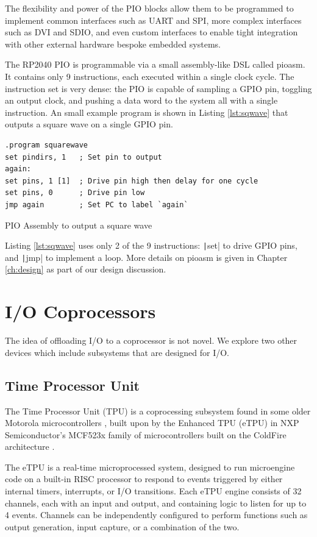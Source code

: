 The flexibility and power of the PIO blocks allow them to be programmed to implement common interfaces such as UART and SPI, more complex interfaces such as DVI and SDIO, and even custom interfaces to enable tight integration with other external hardware bespoke embedded systems.

The RP2040 PIO is programmable via a small assembly-like DSL called pioasm. It contains only 9 instructions, each executed within a single clock cycle. The instruction set is very dense: the PIO is capable of sampling a GPIO pin, toggling an output clock, and pushing a data word to the system all with a single instruction. An small example program is shown in Listing \ref{lst:sqwave} that outputs a square wave on a single GPIO pin.

\begin{listing}[b]
    \vspace{0.5cm}
    \begin{verbatim}
.program squarewave
set pindirs, 1   ; Set pin to output
again:
set pins, 1 [1]  ; Drive pin high then delay for one cycle
set pins, 0      ; Drive pin low
jmp again        ; Set PC to label `again`
    \end{verbatim}
    \caption{PIO Assembly to output a square wave \citep{rp2040}}
    \label{lst:sqwave}
\end{listing}

Listing \ref{lst:sqwave} uses only 2 of the 9 instructions: \texttt|set| to drive GPIO pins, and \texttt|jmp| to implement a loop. More details on pioasm is given in Chapter \ref{ch:design} as part of our design discussion.

\section{I/O Coprocessors}
The idea of offloading I/O to a coprocessor is not novel. We explore two other devices which include subsystems that are designed for I/O.
\subsection{Time Processor Unit}

The Time Processor Unit (TPU) is a coprocessing subsystem found in some older Motorola microcontrollers \cite{tpu}, built upon by the Enhanced TPU (eTPU) in NXP Semiconductor's MCF523x family of microcontrollers built on the ColdFire architecture \cite{mfcdatasheet}.

The eTPU is a real-time microprocessed system, designed to run microengine code on a built-in RISC processor to respond to events triggered by either internal timers, interrupts, or I/O transitions. Each eTPU engine consists of 32 channels, each with an input and output, and containing logic to listen for up to 4 events. Channels can be independently configured to perform functions such as output generation, input capture, or a combination of the two.


